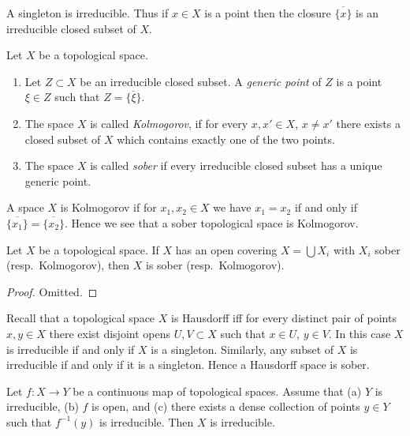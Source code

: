 \noindent
A singleton is irreducible. Thus if $x \in X$ is a point
then the closure $\overline{\{x\}}$ is an irreducible closed
subset of $X$.

\begin{definition}
\label{definition-generic-point}
Let $X$ be a topological space.
\begin{enumerate}
\item Let $Z \subset X$ be an irreducible closed subset.
A {\it generic point} of $Z$ is a point $\xi \in Z$ such
that $Z = \overline{\{\xi\}}$.
\item The space $X$ is called {\it Kolmogorov}, if for every $x, x' \in X$,
$x \not = x'$ there exists a closed subset of $X$ which contains
exactly one of the two points.
\item The space $X$ is called {\it sober} if every
irreducible closed subset has a unique generic point.
\end{enumerate}
\end{definition}

\noindent
A space $X$ is Kolmogorov if for $x_1, x_2 \in X$ we have $x_1 = x_2$
if and only if $\overline{\{x_1\}} = \overline{\{x_2\}}$. Hence we see
that a sober topological space is Kolmogorov.

\begin{lemma}
\label{lemma-sober-local}
Let $X$ be a topological space. If $X$ has an open covering
$X = \bigcup X_i$ with $X_i$ sober (resp.\ Kolmogorov), then
$X$ is sober (resp.\ Kolmogorov).
\end{lemma}

\begin{proof}
Omitted.
\end{proof}

\begin{example}
\label{example-Hausdorff}
Recall that a topological space $X$ is Hausdorff iff for every
distinct pair of points $x, y \in X$ there exist disjoint
opens $U, V \subset X$ such that $x \in U$, $y \in V$.
In this case $X$ is irreducible if and only if $X$ is
a singleton. Similarly, any subset of $X$ is irreducible
if and only if it is a singleton. Hence a Hausdorff space is
sober.
\end{example}

\begin{lemma}
\label{lemma-irreducible-on-top}
Let $f : X \to Y$ be a continuous map of topological spaces.
Assume that
(a) $Y$ is irreducible,
(b) $f$ is open, and
(c) there exists a dense collection of points $y \in Y$ such
that $f^{-1}(y)$ is irreducible.
Then $X$ is irreducible.
\end{lemma}

